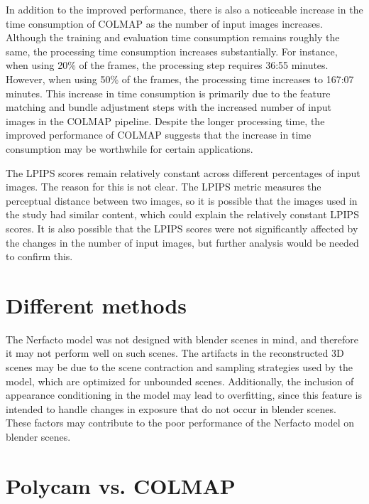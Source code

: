 In addition to the improved performance, there is also a noticeable increase in the time consumption of COLMAP as the number of input images increases. Although the training and evaluation time consumption remains roughly the same, the processing time consumption increases substantially. For instance, when using 20\% of the frames, the processing step requires 36:55 minutes. However, when using 50\% of the frames, the processing time increases to 167:07 minutes. This increase in time consumption is primarily due to the feature matching and bundle adjustment steps with the increased number of input images in the COLMAP pipeline. Despite the longer processing time, the improved performance of COLMAP suggests that the increase in time consumption may be worthwhile for certain applications.

The LPIPS scores remain relatively constant across different percentages of input images. The reason for this is not clear. The LPIPS metric measures the perceptual distance between two images, so it is possible that the images used in the study had similar content, which could explain the relatively constant LPIPS scores. It is also possible that the LPIPS scores were not significantly affected by the changes in the number of input images, but further analysis would be needed to confirm this.

\section{Different methods}
The Nerfacto model was not designed with blender scenes in mind, and therefore it may not perform well on such scenes. The artifacts in the reconstructed 3D scenes may be due to the scene contraction and sampling strategies used by the model, which are optimized for unbounded scenes. Additionally, the inclusion of appearance conditioning in the model may lead to overfitting, since this feature is intended to handle changes in exposure that do not occur in blender scenes. These factors may contribute to the poor performance of the Nerfacto model on blender scenes.

\section{Polycam vs. COLMAP}

